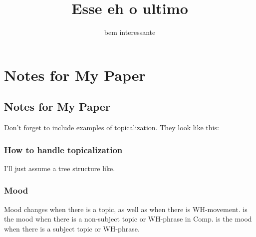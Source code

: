 \documentclass[12pt]{article}
\title{Esse eh o ultimo}
\author{bem interessante}
\begin{document}
\maketitle
\chapter{Notes for My Paper}

\section{Notes for My Paper}

Don't forget to include examples of topicalization.
They look like this:

\subsection{How to handle topicalization}

I'll just assume a tree structure like.

\subsection{Mood}

Mood changes when there is a topic, as well as when
there is WH-movement.  is the mood when
there is a non-subject topic or WH-phrase in Comp.
is the mood when there is a subject topic
or WH-phrase.
\end{document}
